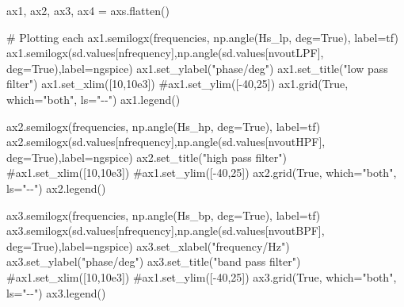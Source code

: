\documentclass[
  letterpaper,
]{scrbook}
\newenvironment{Shaded}{}{}
\newcommand{\CommentTok}[1]{\textcolor[rgb]{0.42,0.45,0.49}{#1}}
\newcommand{\DecValTok}[1]{\textcolor[rgb]{0.00,0.36,0.77}{#1}}
\newcommand{\FloatTok}[1]{\textcolor[rgb]{0.00,0.36,0.77}{#1}}
\newcommand{\NormalTok}[1]{\textcolor[rgb]{0.14,0.16,0.18}{#1}}
\newcommand{\OperatorTok}[1]{\textcolor[rgb]{0.14,0.16,0.18}{#1}}
\newcommand{\StringTok}[1]{\textcolor[rgb]{0.01,0.18,0.38}{#1}}
\newcommand{\VariableTok}[1]{\textcolor[rgb]{0.89,0.38,0.04}{#1}}
\begin{document}
\begin{codelisting}
{\begin{Shaded}
\begin{Highlighting}[]
\NormalTok{ax1, ax2, ax3, ax4 }\OperatorTok{=}\NormalTok{ axs.flatten()}

\CommentTok{\# Plotting each}
\NormalTok{ax1.semilogx(frequencies, np.angle(Hs\_lp, deg}\OperatorTok{=}\VariableTok{True}\NormalTok{), label}\OperatorTok{=}\StringTok{\textquotesingle{}tf\textquotesingle{}}\NormalTok{)}
\NormalTok{ax1.semilogx(sd.values[nfrequency],np.angle(sd.values[nvoutLPF], deg}\OperatorTok{=}\VariableTok{True}\NormalTok{),label}\OperatorTok{=}\StringTok{\textquotesingle{}ngspice\textquotesingle{}}\NormalTok{)}
\NormalTok{ax1.set\_ylabel(}\StringTok{"phase/deg"}\NormalTok{)}
\NormalTok{ax1.set\_title(}\StringTok{"low pass filter"}\NormalTok{)}
\NormalTok{ax1.set\_xlim([}\DecValTok{10}\NormalTok{,}\FloatTok{10e3}\NormalTok{])}
\CommentTok{\#ax1.set\_ylim([{-}40,25])}
\NormalTok{ax1.grid(}\VariableTok{True}\NormalTok{, which}\OperatorTok{=}\StringTok{"both"}\NormalTok{, ls}\OperatorTok{=}\StringTok{"{-}{-}"}\NormalTok{)}
\NormalTok{ax1.legend()}

\NormalTok{ax2.semilogx(frequencies, np.angle(Hs\_hp, deg}\OperatorTok{=}\VariableTok{True}\NormalTok{), label}\OperatorTok{=}\StringTok{\textquotesingle{}tf\textquotesingle{}}\NormalTok{)}
\NormalTok{ax2.semilogx(sd.values[nfrequency],np.angle(sd.values[nvoutHPF], deg}\OperatorTok{=}\VariableTok{True}\NormalTok{),label}\OperatorTok{=}\StringTok{\textquotesingle{}ngspice\textquotesingle{}}\NormalTok{)}
\NormalTok{ax2.set\_title(}\StringTok{"high pass filter"}\NormalTok{)}
\CommentTok{\#ax1.set\_xlim([10,10e3])}
\CommentTok{\#ax1.set\_ylim([{-}40,25])}
\NormalTok{ax2.grid(}\VariableTok{True}\NormalTok{, which}\OperatorTok{=}\StringTok{"both"}\NormalTok{, ls}\OperatorTok{=}\StringTok{"{-}{-}"}\NormalTok{)}
\NormalTok{ax2.legend()}

\NormalTok{ax3.semilogx(frequencies, np.angle(Hs\_bp, deg}\OperatorTok{=}\VariableTok{True}\NormalTok{), label}\OperatorTok{=}\StringTok{\textquotesingle{}tf\textquotesingle{}}\NormalTok{)}
\NormalTok{ax3.semilogx(sd.values[nfrequency],np.angle(sd.values[nvoutBPF], deg}\OperatorTok{=}\VariableTok{True}\NormalTok{),label}\OperatorTok{=}\StringTok{\textquotesingle{}ngspice\textquotesingle{}}\NormalTok{)}
\NormalTok{ax3.set\_xlabel(}\StringTok{"frequency/Hz"}\NormalTok{)}
\NormalTok{ax3.set\_ylabel(}\StringTok{"phase/deg"}\NormalTok{)}
\NormalTok{ax3.set\_title(}\StringTok{"band pass filter"}\NormalTok{)}
\CommentTok{\#ax1.set\_xlim([10,10e3])}
\CommentTok{\#ax1.set\_ylim([{-}40,25])}
\NormalTok{ax3.grid(}\VariableTok{True}\NormalTok{, which}\OperatorTok{=}\StringTok{"both"}\NormalTok{, ls}\OperatorTok{=}\StringTok{"{-}{-}"}\NormalTok{)}
\NormalTok{ax3.legend()}


\end{Highlighting}
\end{Shaded}}
\end{codelisting}
\end{document}
